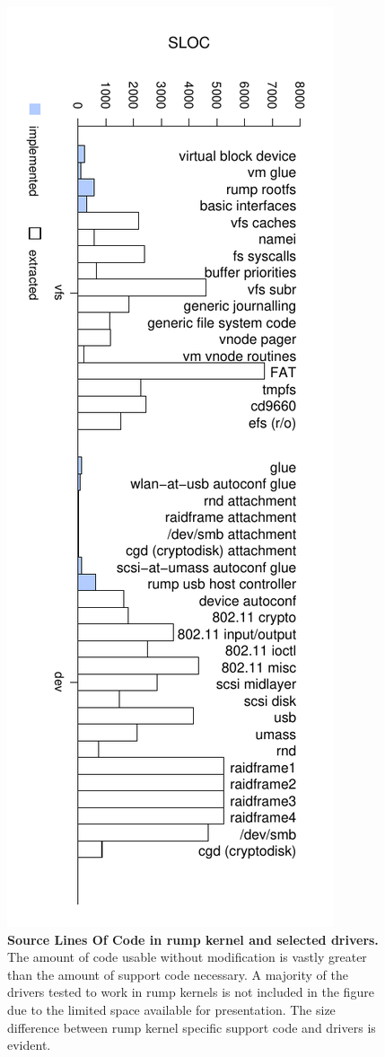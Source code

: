 \begin{figure}
\includegraphics[angle=90,width=\linewidth]{set2}
\caption[Source Lines Of Code in rump kernel and selected drivers]{
\textbf{Source Lines Of Code in rump kernel and selected drivers.}
The amount of code usable without modification is vastly
greater than the amount of support code necessary.  A majority of the
drivers tested to work in rump kernels is not included in the figure
due to the limited space available for presentation.
The size difference between rump kernel specific support code and drivers
is evident.
}
\label{fig:loc}
\end{figure}
\clearpage

